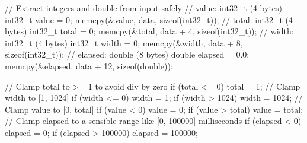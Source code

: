 \documentclass[
  a4paper,
]{scrreprt}
\newenvironment{Shaded}{\begin{snugshade}}{\end{snugshade}}
\newcommand{\CommentTok}[1]{\textcolor[rgb]{0.41,0.41,0.41}{#1}}
\newcommand{\ControlFlowTok}[1]{\textcolor[rgb]{0.85,0.12,0.09}{#1}}
\newcommand{\DataTypeTok}[1]{\textcolor[rgb]{0.47,0.16,0.63}{#1}}
\newcommand{\DecValTok}[1]{\textcolor[rgb]{0.47,0.16,0.63}{#1}}
\newcommand{\FloatTok}[1]{\textcolor[rgb]{0.65,0.35,0.00}{#1}}
\newcommand{\KeywordTok}[1]{\textcolor[rgb]{0.85,0.12,0.09}{#1}}
\newcommand{\NormalTok}[1]{\textcolor[rgb]{0.33,0.33,0.33}{#1}}
\newcommand{\OperatorTok}[1]{\textcolor[rgb]{0.00,0.46,0.62}{#1}}
\theoremstyle{definition}
\theoremstyle{remark}
\begin{document}
\begin{Shaded}
\begin{Highlighting}[numbers=left,,]
    \CommentTok{// Extract integers and double from input safely}
    \CommentTok{// value: int32\_t (4 bytes)}
    \DataTypeTok{int32\_t}\NormalTok{ value }\OperatorTok{=} \DecValTok{0}\OperatorTok{;}
\NormalTok{    memcpy}\OperatorTok{(\&}\NormalTok{value}\OperatorTok{,}\NormalTok{ data}\OperatorTok{,} \KeywordTok{sizeof}\OperatorTok{(}\DataTypeTok{int32\_t}\OperatorTok{));}
    \CommentTok{// total: int32\_t (4 bytes)}
    \DataTypeTok{int32\_t}\NormalTok{ total }\OperatorTok{=} \DecValTok{0}\OperatorTok{;}
\NormalTok{    memcpy}\OperatorTok{(\&}\NormalTok{total}\OperatorTok{,}\NormalTok{ data }\OperatorTok{+} \DecValTok{4}\OperatorTok{,} \KeywordTok{sizeof}\OperatorTok{(}\DataTypeTok{int32\_t}\OperatorTok{));}
    \CommentTok{// width: int32\_t (4 bytes)}
    \DataTypeTok{int32\_t}\NormalTok{ width }\OperatorTok{=} \DecValTok{0}\OperatorTok{;}
\NormalTok{    memcpy}\OperatorTok{(\&}\NormalTok{width}\OperatorTok{,}\NormalTok{ data }\OperatorTok{+} \DecValTok{8}\OperatorTok{,} \KeywordTok{sizeof}\OperatorTok{(}\DataTypeTok{int32\_t}\OperatorTok{));}
    \CommentTok{// elapsed: double (8 bytes)}
    \DataTypeTok{double}\NormalTok{ elapsed }\OperatorTok{=} \FloatTok{0.0}\OperatorTok{;}
\NormalTok{    memcpy}\OperatorTok{(\&}\NormalTok{elapsed}\OperatorTok{,}\NormalTok{ data }\OperatorTok{+} \DecValTok{12}\OperatorTok{,} \KeywordTok{sizeof}\OperatorTok{(}\DataTypeTok{double}\OperatorTok{));}

    \CommentTok{// Clamp total to \textgreater{}= 1 to avoid div by zero}
    \ControlFlowTok{if} \OperatorTok{(}\NormalTok{total }\OperatorTok{\textless{}=} \DecValTok{0}\OperatorTok{)}\NormalTok{ total }\OperatorTok{=} \DecValTok{1}\OperatorTok{;}
    \CommentTok{// Clamp width to [1, 1024]}
    \ControlFlowTok{if} \OperatorTok{(}\NormalTok{width }\OperatorTok{\textless{}=} \DecValTok{0}\OperatorTok{)}\NormalTok{ width }\OperatorTok{=} \DecValTok{1}\OperatorTok{;}
    \ControlFlowTok{if} \OperatorTok{(}\NormalTok{width }\OperatorTok{\textgreater{}} \DecValTok{1024}\OperatorTok{)}\NormalTok{ width }\OperatorTok{=} \DecValTok{1024}\OperatorTok{;}
    \CommentTok{// Clamp value to [0, total]}
    \ControlFlowTok{if} \OperatorTok{(}\NormalTok{value }\OperatorTok{\textless{}} \DecValTok{0}\OperatorTok{)}\NormalTok{ value }\OperatorTok{=} \DecValTok{0}\OperatorTok{;}
    \ControlFlowTok{if} \OperatorTok{(}\NormalTok{value }\OperatorTok{\textgreater{}}\NormalTok{ total}\OperatorTok{)}\NormalTok{ value }\OperatorTok{=}\NormalTok{ total}\OperatorTok{;}
    \CommentTok{// Clamp elapsed to a sensible range like [0, 100000] milliseconds}
    \ControlFlowTok{if} \OperatorTok{(}\NormalTok{elapsed }\OperatorTok{\textless{}} \DecValTok{0}\OperatorTok{)}\NormalTok{ elapsed }\OperatorTok{=} \DecValTok{0}\OperatorTok{;}
    \ControlFlowTok{if} \OperatorTok{(}\NormalTok{elapsed }\OperatorTok{\textgreater{}} \DecValTok{100000}\OperatorTok{)}\NormalTok{ elapsed }\OperatorTok{=} \DecValTok{100000}\OperatorTok{;}


\end{Highlighting}
\end{Shaded}
\end{document}
